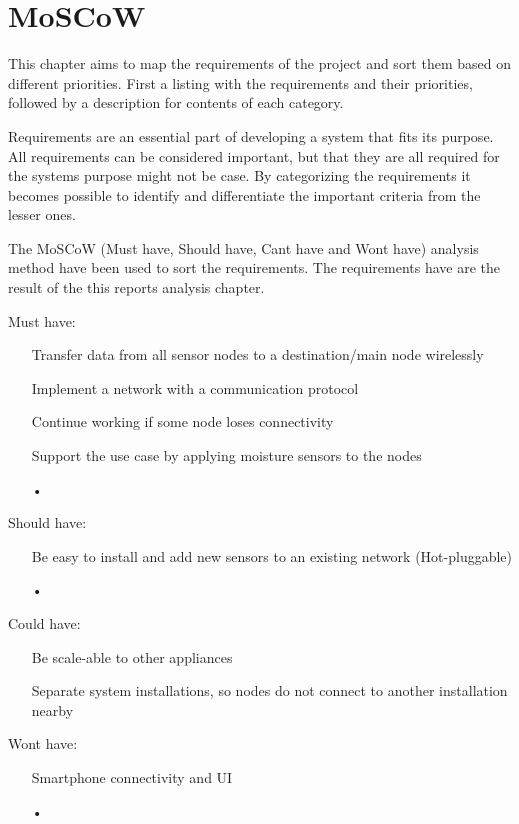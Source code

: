 \chapter{MoSCoW}
This chapter aims to map the requirements of the project and sort them based on different priorities. First a listing with the requirements and their priorities, followed by a description for contents of each category.

Requirements are an essential part of developing a system that fits its purpose. All requirements can be considered important, but that they are all required for the systems purpose might not be case. By categorizing the requirements it becomes possible to identify and differentiate the important criteria from the lesser ones. 

The MoSCoW (Must have, Should have, Cant have and Wont have) analysis method have been used to sort the requirements. The requirements have are the result of the this reports analysis chapter.


Must have:
\begin{itemize}
\item[Transfer data from all sensor nodes to a destination/main node wirelessly]
\item[Implement a network with a communication protocol]
\item[Continue working if some node loses connectivity]
\item[Support the use case by applying moisture sensors to the nodes]
\item[•]
\end{itemize}

Should have:
\begin{itemize}
\item[Be easy to install and add new sensors to an existing network (Hot-pluggable)]
\item[•]
\end{itemize}

Could have:
\begin{itemize}
\item[Be scale-able to other appliances]
\item[Separate system installations, so nodes do not connect to another installation nearby]
\item[]
\end{itemize}

Wont have:
\begin{itemize}
\item[Smartphone connectivity and UI]
\item[•]
\end{itemize}

